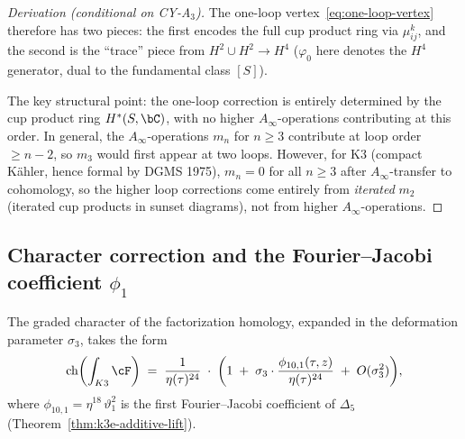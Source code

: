 \begin{proof}[Derivation (conditional on CY-A$_3$)]
The one-loop vertex~\eqref{eq:one-loop-vertex} therefore has two
pieces: the first encodes the full cup product ring via $\mu^k_{ij}$,
and the second is the ``trace'' piece from $H^2 \cup H^2 \to H^4$
($\varphi_0$ here denotes the $H^4$ generator, dual to the fundamental
class $[S]$).

The key structural point: the one-loop correction is entirely
determined by the cup product ring $H^*(S, \bC)$, with no
higher $A_\infty$-operations contributing at this order.
In general, the $A_\infty$-operations $m_n$ for $n \geq 3$
contribute at loop order $\geq n - 2$, so $m_3$ would first
appear at two loops. However, for K3 (compact K\"ahler,
hence formal by DGMS 1975), $m_n = 0$ for all $n \geq 3$
after $A_\infty$-transfer to cohomology, so the higher loop
corrections come entirely from \emph{iterated} $m_2$
(iterated cup products in sunset diagrams), not from
higher $A_\infty$-operations.
\end{proof}

\subsection{Character correction and the Fourier--Jacobi coefficient $\phi_1$}
\label{subsec:k3-fact-character}

\begin{conjecture}
\label{conj:k3-fact-character}
\ClaimStatusConjectured
The graded character of the factorization homology, expanded in
the deformation parameter $\sigma_3$, takes the form
\begin{equation}\label{eq:k3-fact-char-expansion}
  \operatorname{ch}\biggl(\int_{K3} \cF\biggr)
  \;=\;
  \frac{1}{\eta(\tau)^{24}}
  \;\cdot\;
  \biggl(
    1
    \;+\;
    \sigma_3 \cdot \frac{\phi_{10,1}(\tau, z)}{\eta(\tau)^{24}}
    \;+\;
    O(\sigma_3^2)
  \biggr),
\end{equation}
where $\phi_{10,1} = \eta^{18}\,\vartheta_1^2$ is the first
Fourier--Jacobi coefficient of $\Delta_5$
(Theorem~\textup{\ref{thm:k3e-additive-lift}}).
\end{conjecture}

